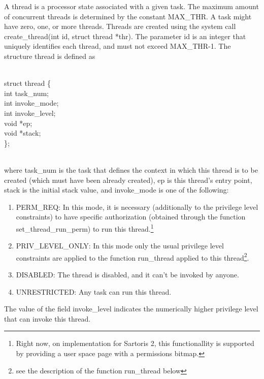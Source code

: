\documentclass[11pt, letterpaper, twoside, english]{book}
\begin{document}
A thread is a processor state associated with a given task. The maximum amount of concurrent threads is determined by the constant \textsf{MAX\_THR}. A task might have zero, one, or more threads. Threads are created using the system call \textsf{create\_thread(int id, struct thread *thr)}. The parameter \textsf{id} is an integer that uniquely identifies each thread, and must not exceed \textsf{MAX\_THR}-1. The structure \textsf{thread} is defined as \\
\\
\begin{sf} \noindent struct thread \{ \\
\indent  int task\_num; \\
\indent  int invoke\_mode; \\
\indent  int invoke\_level; \\
\indent  void *ep; \\
\indent  void *stack; \\
\}; \\
\end{sf}
\\
where \textsf{task\_num} is the task that defines the context in which this thread is to be created (which must have been already created), \textsf{ep} is this thread's entry point, \textsf{stack} is the initial stack value, and \textsf{invoke\_mode} is one of the following:
\begin{enumerate}
\item[] \textsf{PERM\_REQ}: In this mode, it is necessary (additionally to the privilege level constraints) to have specific authorization (obtained through the function \textsf{set\_thread\_run\_perm}) to run this thread.\footnote{Right now, on implementation for Sartoris 2, this functionallity is supported by providing a user space page with a permissions bitmap.}
\item[] \textsf{PRIV\_LEVEL\_ONLY}: In this mode only the usual privilege level constraints are applied to the function \textsf{run\_thread} applied to this thread\footnote{see the description of the function \textsf{run\_thread} below}.
\item[] \textsf{DISABLED}: The thread is disabled, and it can't be invoked by anyone.
\item[] \textsf{UNRESTRICTED}: Any task can run this thread.
\end{enumerate}
The value of the field \textsf{invoke\_level} indicates the numerically higher privilege level that can invoke this thread. 
\end{document}
